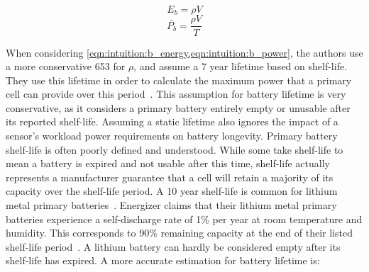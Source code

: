 \begin{equation} \label{eqn:intuition:b_energy}
E_b = \rho V 
\end{equation}
\begin{equation} \label{eqn:intuition:b_power}
\bar{P_b} = \frac{\rho V}{T}
\end{equation}
%
%
%
%
%
%


\noindent When considering \cref{eqn:intuition:b_energy,eqn:intuition:b_power}, the authors use a more conservative 653\ssi[per-mode=symbol]{\milli\Wh\per\cm\cubed} for $\rho$, 
and assume a 7 year lifetime based on shelf-life. They use this lifetime in order to calculate the maximum power that a primary cell can provide over this period~\cite{yervaGrafting12}.
This assumption for battery lifetime is very conservative, as it considers a primary battery entirely empty or unusable after its reported shelf-life.
Assuming a static lifetime also ignores the impact of a sensor's workload power requirements on battery longevity.
Primary battery shelf-life is often poorly defined and understood. While some take shelf-life to mean a battery is expired and not usable after this time, shelf-life actually represents a manufacturer guarantee that a cell will retain a majority of its capacity over the shelf-life period. 
A 10 year shelf-life is common for lithium metal primary batteries~\cite{primary2032,primarycr123a,energizerAppMan}.
Energizer claims that their lithium metal primary batteries experience a self-discharge rate of 1\% per year at room temperature and humidity. This corresponds to 90\% remaining capacity at the end of their listed shelf-life period~\cite{energizerAppMan}.
A lithium battery can hardly be considered empty after its shelf-life has expired.
A more accurate estimation for battery lifetime is:

